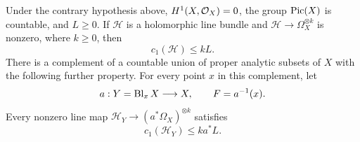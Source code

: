 \begin{lemma}\label{nv:slope}
Under the contrary hypothesis above, \(H^1(X,\mathcal O_X)=0\), the group
\(\operatorname{Pic}(X)\) is countable, and \(L\ge0\).  If \(\mathscr H\) is a holomorphic
line bundle and
\(\mathscr H\longrightarrow\Omega_X^{\otimes k}\) is nonzero, where
\(k\ge0\), then
\begin{equation}\label{nv:slope-X}
 c_1(\mathscr H)\le kL .
\end{equation}
There is a complement of a countable union of proper analytic subsets of
\(X\) with the following further property.  For every point \(x\) in this
complement, let
\[
 a:Y=\operatorname{Bl}_xX\longrightarrow X,\qquad F=a^{-1}(x).
\]
Every nonzero line map
\(\mathscr H_Y\longrightarrow (a^*\Omega_X)^{\otimes k}\) satisfies
\begin{equation}\label{nv:slope-blowup}
 c_1(\mathscr H_Y)\le k a^*L .
\end{equation}
\end{lemma}

